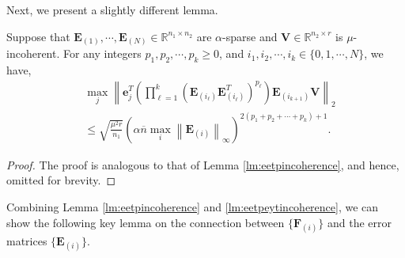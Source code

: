 \documentclass[twoside,11pt]{article}
\newcommand{\norm}[1]{\left\lVert#1\right\rVert}
\newcommand{\matE}{\mathbf{E}}
\newcommand{\matF}{\mathbf{F}}
\newcommand{\matV}{\mathbf{V}}
\newcommand{\matVst}{{\mathbf{V}^\star}}
\newcommand{\vece}{\mathbf{e}}
\newcommand{\bn}{{\overline{n}}}
\newcommand{\abnb}{\alpha \bn\max_{i}\norm{\matE_{(i)}}_{\infty}}
\newcommand{\antwob}{\alpha n_2\max_{i}\norm{\matE_{(i)}}_{\infty}}
\newcommand{\murnone}{\frac{\mu^2 r}{n_1}}
\newcommand{\murntwo}{\frac{\mu^2 r}{n_2}}
\begin{document}
Next, we present a slightly different lemma.
\begin{lemma}
\label{lm:eetpeytincoherence}
Suppose that $\matE_{(1)},\cdots,\matE_{(N)}\in \mathbb{R}^{n_1\times n_2}$ are $\alpha$-sparse and  $\matV\in \mathbb{R}^{n_2\times r}$ is $\mu$-incoherent. For any integers $p_1,p_2,\cdots,p_k\ge 0$, and $i_1,i_2,\cdots,i_k\in\{0,1,\cdots,N\}$, we have,
\begin{equation}
\label{eqn:eetpeytincoherence}
\begin{aligned}
&\max_j\norm{\vece_j^T\left(\prod_{\ell=1}^k(\matE_{(i_{\ell})}\matE_{(i_{\ell})}^T)^{p_{\ell}}\right)\matE_{(i_{k+1})}\matV}_2\\
&\le \sqrt{\murnone}\left(\abnb\right)^{2(p_1+p_2+\cdots+p_k)+1}.%
\end{aligned}
\end{equation}
\end{lemma}
\begin{proof}
The proof is analogous to that of Lemma \ref{lm:eetpincoherence}, and hence, omitted for brevity.
\end{proof}

Combining Lemma \ref{lm:eetpincoherence} and \ref{lm:eetpeytincoherence}, we can show the following key lemma on the connection between $\{\matF_{(i)}\}$ and the error matrices $\{\matE_{(i)}\}$.
\end{document}

